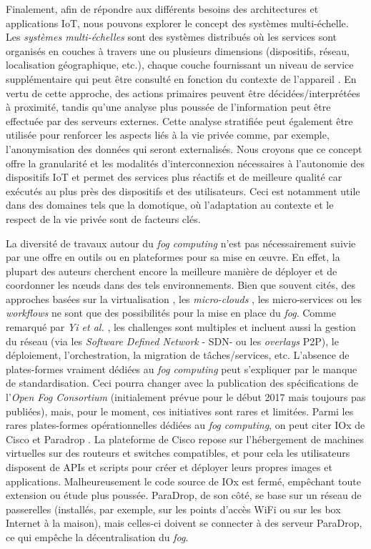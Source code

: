 Finalement, afin de répondre aux différents besoins des architectures et applications IoT, nous pouvons explorer le concept des systèmes multi-échelle. Les \textit {systèmes multi-échelles} sont des systèmes distribués où les services sont organisés en couches à travers une ou plusieurs dimensions (dispositifs, réseau, localisation géographique, etc.), chaque couche fournissant un niveau de service supplémentaire qui peut être consulté en fonction du contexte de l'appareil \cite{Rottenberg2012,Rottenberg2014}.  En vertu de cette approche, des actions primaires peuvent être décidées/interprétées à proximité, tandis qu'une analyse plus poussée de l'information peut être effectuée par des serveurs externes. Cette analyse stratifiée peut également être utilisée pour renforcer les aspects liés à la vie privée comme, par exemple, l'anonymisation des données qui seront externalisés. Nous croyons que ce concept offre la granularité et les modalités d'interconnexion nécessaires à l'autonomie des dispositifs IoT et permet des services plus réactifs et de meilleure qualité car exécutés au plus près des dispositifs et des utilisateurs. Ceci est notamment utile dans des domaines tels que la domotique, où l'adaptation au contexte et le respect de la vie privée sont de facteurs clés.

La diversité de travaux autour du \textit{fog computing} n'est pas nécessairement suivie par une offre en outils ou en plateformes pour sa mise en {\oe}uvre. En effet, la plupart des auteurs cherchent encore la meilleure manière de déployer et de coordonner les n{\oe}uds dans des tels environnements. Bien que souvent cités, des approches basées sur la virtualisation \cite{Satyanarayanan09}, les \textit{micro-clouds} \cite{Elkhatib2017},  les micro-services \cite{Villari2016} ou les \textit{workflows} \cite{Hao2017} ne sont que des possibilités pour la mise en place du \textit{fog}. Comme remarqué par \textit{Yi et al.} \cite{Yi2015}, les challenges sont multiples et incluent aussi la gestion du réseau (via les \textit{Software Defined Network} - SDN- ou les \textit{overlays} P2P), le déploiement, l'orchestration, la migration de tâches/services, etc. L'absence de plates-formes vraiment dédiées au \textit{fog computing} peut s'expliquer par le manque de standardisation. Ceci pourra changer avec la publication des spécifications de l'\textit{Open Fog Consortium} (initialement prévue pour le début 2017 mais toujours pas publiées), mais, pour le moment, ces initiatives sont rares et limitées. Parmi les rares plates-formes opérationnelles dédiées au \textit{fog computing}, on peut citer IOx de Cisco \cite{IOx2017} et Paradrop \cite{Willis2014}. La plateforme de Cisco repose sur l'hébergement de machines virtuelles sur des routeurs et switches compatibles, et pour cela les utilisateurs disposent de APIs et scripts pour créer et déployer leurs propres images et applications. Malheureusement le code source de IOx est fermé, empêchant toute extension ou étude plus poussée. ParaDrop, de son côté, se base sur un réseau de passerelles (installés, par exemple, sur les points d'accès WiFi ou sur les box Internet à la maison), mais celles-ci doivent se connecter à des serveur ParaDrop, ce qui empêche la décentralisation du \textit{fog}. 
 
